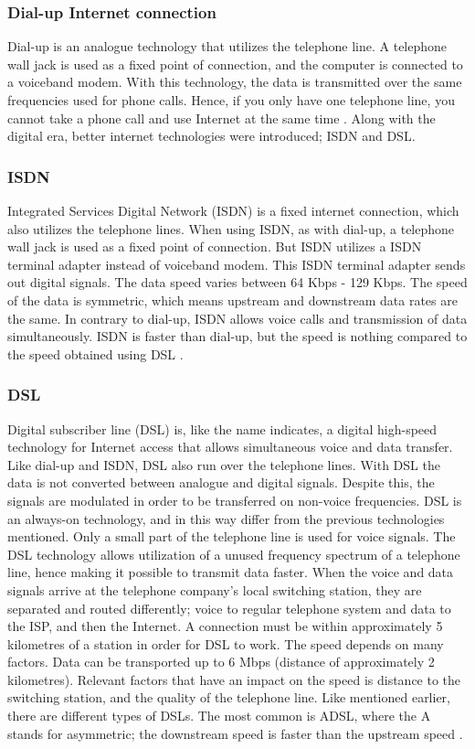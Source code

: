 \subsubsection{Dial-up Internet connection}
Dial-up is an analogue technology that utilizes the telephone line. A telephone wall jack is used as a fixed point of connection, and the computer is connected to a voiceband modem. With this technology, the data is transmitted over the same frequencies used for phone calls. Hence, if you only have one telephone line, you cannot take a phone call and use Internet at the same time \cite{differentuplinks}. Along with the digital era, better internet technologies were introduced; ISDN and DSL. 

\subsubsection{ISDN}
Integrated Services Digital Network (ISDN) is a fixed internet connection, which also utilizes the telephone lines. When using ISDN, as with dial-up, a telephone wall jack is used as a fixed point of connection. But ISDN utilizes a ISDN terminal adapter instead of voiceband modem. This ISDN terminal adapter sends out digital signals. The data speed varies between 64 Kbps - 129 Kbps. The speed of the data is symmetric, which means upstream and downstream data rates are the same. In contrary to dial-up, ISDN allows voice calls and transmission of data simultaneously. ISDN is faster than dial-up, but the speed is nothing compared to the speed obtained using DSL \cite{differentuplinks}. 

\subsubsection{DSL}
Digital subscriber line (DSL) is, like the name indicates, a digital high-speed technology for Internet access that allows simultaneous voice and data transfer. Like dial-up and ISDN, DSL also run over the telephone lines. With DSL the data is not converted between analogue and digital signals. Despite this, the signals are modulated in order to be transferred on non-voice frequencies. DSL is an always-on technology, and in this way differ from the previous technologies mentioned. Only a small part of the telephone line is used for voice signals. The DSL technology allows utilization of a unused frequency spectrum of a telephone line, hence making it possible to transmit data faster. When the voice and data signals arrive at the telephone company's local switching station, they are separated and routed differently; voice to regular telephone system and data to the ISP, and then the Internet. A connection must be within approximately 5 kilometres of a station in order for DSL to work. The speed depends on many factors. Data can be transported up to 6 Mbps (distance of approximately 2 kilometres). Relevant factors that have an impact on the speed is distance to the switching station, and the quality of the telephone line. Like mentioned earlier, there are different types of DSLs. The most common is ADSL, where the A stands for asymmetric; the downstream speed is faster than the upstream speed \cite{differentuplinks}.

